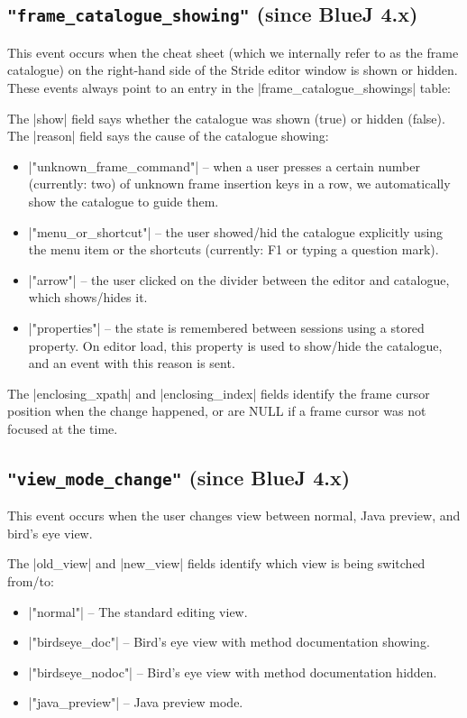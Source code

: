 \documentclass{report}
\begin{document}
\subsection{\lstinline!"frame_catalogue_showing"! (since BlueJ 4.x)}

This event occurs when the cheat sheet (which we internally refer to as the frame catalogue)
on the right-hand side of the Stride editor window is shown or hidden.  These events always
point to an entry in the |frame_catalogue_showings| table:


The |show| field says whether the catalogue was shown (true) or hidden (false).  The |reason| field
says the cause of the catalogue showing:
\begin{itemize}
\item |"unknown_frame_command"| -- when a user presses a certain number (currently: two) of unknown
frame insertion keys in a row, we automatically show the catalogue to guide them.
\item |"menu_or_shortcut"| -- the user showed/hid the catalogue explicitly using the menu item or
the shortcuts (currently: F1 or typing a question mark).
\item |"arrow"| -- the user clicked on the divider between the editor and catalogue, which shows/hides it.
\item |"properties"| -- the state is remembered between sessions using a stored property.  On editor load,
this property is used to show/hide the catalogue, and an event with this reason is sent.
\end{itemize}

The |enclosing_xpath| and |enclosing_index| fields identify the frame cursor position when the change happened,
or are NULL if a frame cursor was not focused at the time.

\subsection{\lstinline!"view_mode_change"! (since BlueJ 4.x)}

This event occurs when the user changes view between normal, Java preview, and bird's eye view.


The |old_view| and |new_view| fields identify which view is being switched from/to:
\begin{itemize}
\item |"normal"| -- The standard editing view.
\item |"birdseye_doc"| -- Bird's eye view with method documentation showing.
\item |"birdseye_nodoc"| -- Bird's eye view with method documentation hidden.
\item |"java_preview"| -- Java preview mode.
\end{itemize}
\end{document}
